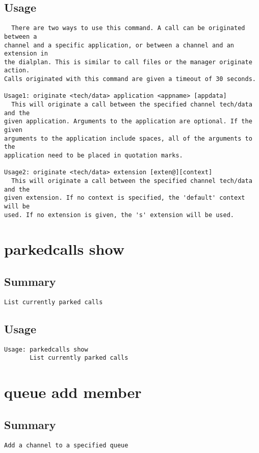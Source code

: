 \subsection{Usage}
\begin{verbatim}
  There are two ways to use this command. A call can be originated between a
channel and a specific application, or between a channel and an extension in
the dialplan. This is similar to call files or the manager originate action.
Calls originated with this command are given a timeout of 30 seconds.

Usage1: originate <tech/data> application <appname> [appdata]
  This will originate a call between the specified channel tech/data and the
given application. Arguments to the application are optional. If the given
arguments to the application include spaces, all of the arguments to the
application need to be placed in quotation marks.

Usage2: originate <tech/data> extension [exten@][context]
  This will originate a call between the specified channel tech/data and the
given extension. If no context is specified, the 'default' context will be
used. If no extension is given, the 's' extension will be used.

\end{verbatim}


\section{parkedcalls show}
\subsection{Summary}
\begin{verbatim}
List currently parked calls
\end{verbatim}
\subsection{Usage}
\begin{verbatim}
Usage: parkedcalls show
       List currently parked calls

\end{verbatim}


\section{queue add member}
\subsection{Summary}
\begin{verbatim}
Add a channel to a specified queue
\end{verbatim}
